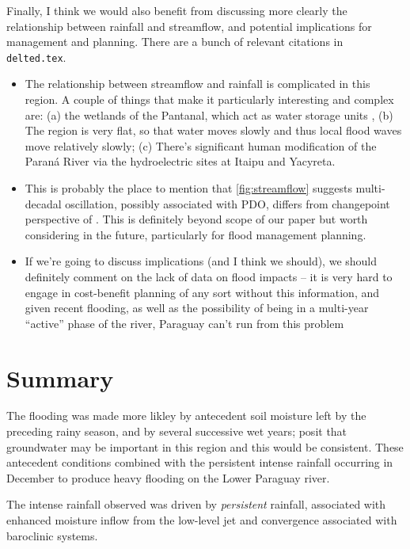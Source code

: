 \documentclass[twocol]{ametsoc}
\begin{document}
Finally, I think we would also benefit from discussing more clearly the relationship between rainfall and streamflow, and potential implications for management and planning.
There are a bunch of relevant citations in \texttt{delted.tex}.
\begin{itemize}
	\item The relationship between streamflow and rainfall is complicated in this region. A couple of things that make it particularly interesting and complex are: (a) the wetlands of the Pantanal, which act as water storage units \citep{Bravo:2011et,Barros:2004bn}, (b) The region is very flat, so that water moves slowly and thus local flood waves move relatively slowly; (c) There's significant human modification of the Paran\'a River via the hydroelectric sites at Itaipu and Yacyreta.
  \item This is probably the place to mention that \cref{fig:streamflow} suggests multi-decadal oscillation, possibly associated with PDO, differs from changepoint perspective of \citet{Collischonn:2001bi}.
	This is definitely beyond scope of our paper but worth considering in the future, particularly for flood management planning.
	\item If we're going to discuss implications (and I think we should), we should definitely comment on the lack of data on flood impacts -- it is very hard to engage in cost-benefit planning of any sort without this information, and given recent flooding, as well as the possibility of being in a multi-year ``active'' phase of the river, Paraguay can't run from this problem
\end{itemize}



\section{Summary} \label{sec:summary}

The flooding was made more likley by antecedent soil moisture left by the preceding rainy season, and by several successive wet years; \citet{Santos:2016td} posit that groundwater may be important in this region and this would be consistent. These antecedent conditions combined with the persistent intense rainfall occurring in December to produce heavy flooding on the Lower Paraguay river.

The intense rainfall observed was driven by \emph{persistent} rainfall, associated with enhanced moisture inflow from the low-level jet and convergence associated with baroclinic systems.
\end{document}
